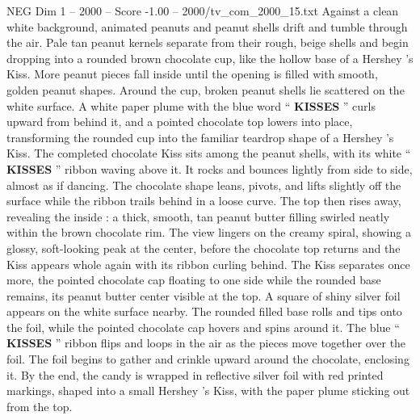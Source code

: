 \begin{textsample}{NEG Dim 1 – 2000 – Score -1.00 – 2000/tv\_com\_2000\_15.txt}  \label{ex:f1_neg_066}
Against a clean white background, animated peanuts and peanut shells drift and tumble through the air.
Pale tan peanut kernels separate from their rough, beige shells and begin dropping into a rounded brown chocolate cup, like the hollow base of a Hershey ’s Kiss.
More peanut pieces fall inside until the opening is filled with smooth, golden peanut shapes.
Around the cup, broken peanut shells lie scattered on the white surface.
A white paper plume with the blue word “ \textbf{KISSES} ” curls upward from behind it, and a pointed chocolate top lowers into place, transforming the rounded cup into the familiar teardrop shape of a Hershey ’s Kiss.
The completed chocolate Kiss sits among the peanut shells, with its white “ \textbf{KISSES} ” ribbon waving above it.
It rocks and bounces lightly from side to side, almost as if dancing.
The chocolate shape leans, pivots, and lifts slightly off the surface while the ribbon trails behind in a loose curve.
The top then rises away, revealing the inside : a thick, smooth, tan peanut butter filling swirled neatly within the brown chocolate rim.
The view lingers on the creamy spiral, showing a glossy, soft-looking peak at the center, before the chocolate top returns and the Kiss appears whole again with its ribbon curling behind.
The Kiss separates once more, the pointed chocolate cap floating to one side while the rounded base remains, its peanut butter center visible at the top.
A square of shiny silver foil appears on the white surface nearby.
The rounded filled base rolls and tips onto the foil, while the pointed chocolate cap hovers and spins around it.
The blue “ \textbf{KISSES} ” ribbon flips and loops in the air as the pieces move together over the foil.
The foil begins to gather and crinkle upward around the chocolate, enclosing it.
By the end, the candy is wrapped in reflective silver foil with red printed markings, shaped into a small Hershey ’s Kiss, with the paper plume sticking out from the top.

\end{textsample}
